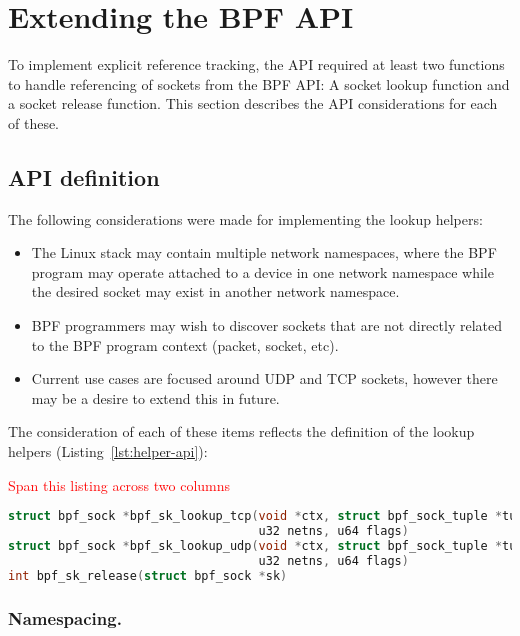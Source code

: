 \documentclass[10pt,sigconf,authorversion]{lpc}
\newcommand\todo[1]{\textcolor{red}{#1}}
\begin{document}
\section{Extending the BPF API}

To implement explicit reference tracking, the API required at least two
functions to handle referencing of sockets from the BPF API: A socket lookup
function and a socket release function. This section describes the API
considerations for each of these.

\subsection{API definition}

The following considerations were made for implementing the lookup helpers:

\begin{itemize}
    \item The Linux stack may contain multiple network namespaces, where the
          BPF program may operate attached to a device in one network namespace
          while the desired socket may exist in another network namespace.
    \item BPF programmers may wish to discover sockets that are not directly
          related to the BPF program context (packet, socket, etc).
    \item Current use cases are focused around UDP and TCP sockets, however
          there may be a desire to extend this in future.
\end{itemize}

The consideration of each of these items reflects the definition of the lookup
helpers (Listing~\ref{lst:helper-api}):

\todo{Span this listing across two columns}
\begin{lstlisting}[caption={BPF API helper functions for socket lookup},language=c,label=lst:helper-api,breaklines=true]
struct bpf_sock *bpf_sk_lookup_tcp(void *ctx, struct bpf_sock_tuple *tuple, u32 tuple_size,
                                   u32 netns, u64 flags)
struct bpf_sock *bpf_sk_lookup_udp(void *ctx, struct bpf_sock_tuple *tuple, u32 tuple_size,
                                   u32 netns, u64 flags)
int bpf_sk_release(struct bpf_sock *sk)
\end{lstlisting}

\subsubsection{Namespacing.}
\end{document}
